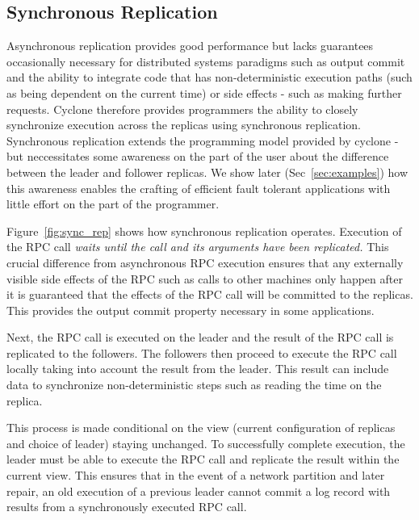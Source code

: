 \documentclass[twocolumn]{article}
\begin{document}
\subsection{Synchronous Replication}
\label{sec:synch}
Asynchronous replication provides good performance but lacks guarantees
occasionally necessary for distributed systems paradigms such as output commit
and the ability to integrate code that has non-deterministic execution paths
(such as being dependent on the current time) or side effects - such as making
further requests. Cyclone therefore provides programmers the ability to closely
synchronize execution across the replicas using synchronous
replication. Synchronous replication extends the programming model provided by
cyclone - but neccessitates some awareness on the part of the user about the
difference between the leader and follower replicas. We show later
(Sec~\ref{sec:examples}) how this awareness enables the crafting of efficient
fault tolerant applications with little effort on the part of the programmer.

Figure~\ref{fig:sync_rep} shows how synchronous replication operates.  Execution
of the RPC call \emph{waits until the call and its arguments have been
  replicated.} This crucial difference from asynchronous RPC execution ensures
that any externally visible side effects of the RPC such as calls to other
machines only happen after it is guaranteed that the effects of the RPC call
will be committed to the replicas. This provides the output commit property
necessary in some applications.

Next, the RPC call is executed on the leader and the result of the RPC call is
replicated to the followers. The followers then proceed to execute the RPC call
locally taking into account the result from the leader. This result can include
data to synchronize non-deterministic steps such as reading the time on the
replica.

This process is made conditional on the view (current configuration of
replicas and choice of leader) staying unchanged. To successfully complete
execution, the leader must be able to execute the RPC call and replicate the
result within the current view. This ensures that in the event of a network
partition and later repair, an old execution of a previous leader cannot commit a
log record with results from a synchronously executed RPC call.
\end{document}
